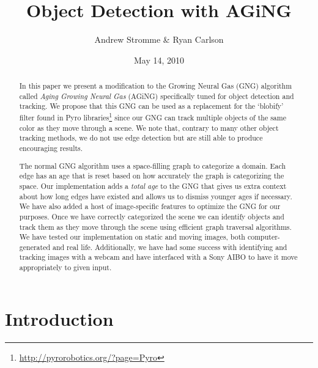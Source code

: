 \documentclass{article}
\renewcommand{\|}{\origbar} %
\begin{document}
\title{Object Detection with AGiNG}
\author{Andrew Stromme \& Ryan Carlson}
\date{May 14, 2010}
\maketitle

\begin{abstract}
  In this paper we present a modification to the Growing Neural Gas (GNG) algorithm called {\em Aging Growing Neural Gas} (AGiNG) specifically tuned for object detection and tracking. We propose that this GNG can be used as a replacement for the `blobify' filter found in Pyro libraries\footnote{\url{http://pyrorobotics.org/?page=Pyro}} since our GNG can track multiple objects of the same color as they move through a scene. We note that, contrary to many other object tracking methods, we do not use edge detection but are still able to produce encouraging results.
  
  The normal GNG algorithm uses a space-filling graph to categorize a domain. Each edge has an age that is reset based on how accurately the graph is categorizing the space. Our implementation adds a {\em total age} to the GNG that gives us extra context about how long edges have existed and allows us to dismiss younger ages if necessary. We have also added a host of image-specific features to optimize the GNG for our purposes. Once we have correctly categorized the scene we can identify objects and track them as they move through the scene using efficient graph traversal algorithms. We have tested our implementation on static and moving images, both computer-generated and real life. Additionally, we have had some success with identifying and tracking images with a webcam and have interfaced with a Sony AIBO to have it move appropriately to given input.
\end{abstract}

\section{Introduction}


\end{document}
